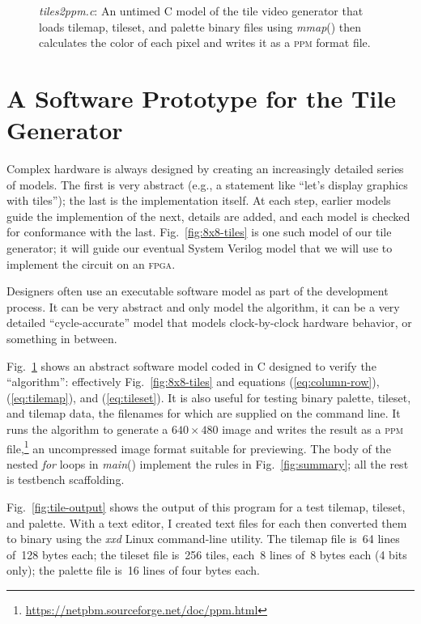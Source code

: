 \documentclass[11pt]{article}
\newcommand{\figref}[1]{Fig.~\ref{fig:#1}}
\newcommand{\equref}[1]{(\ref{eq:#1})}
\begin{document}
\begin{figure}
  
  \caption{\emph{tiles2ppm.c}:
    An untimed C model of the tile video generator that loads
    tilemap, tileset, and palette binary files using
    \emph{mmap}() then calculates the color of each pixel
    and writes it as a \textsc{ppm} format file.}
\label{fig:tile-sw}
\end{figure}

\section{A Software Prototype for the Tile Generator}

Complex hardware is always designed by creating an increasingly
detailed series of models.  The first is very abstract (e.g., a
statement like ``let's display graphics with tiles''); the last is the
implementation itself.  At each step, earlier models guide the
implemention of the next, details are added, and each model is checked
for conformance with the last.  \figref{8x8-tiles} is one such model
of our tile generator; it will guide our eventual System Verilog model
that we will use to implement the circuit on an \textsc{fpga}.

Designers often use an executable software model as part of the
development process.  It can be very abstract and only model the
algorithm, it can be a very detailed ``cycle-accurate'' model that
models clock-by-clock hardware behavior, or something in between.

\figref{tile-sw} shows an abstract software model coded in C designed
to verify the ``algorithm'': effectively \figref{8x8-tiles} and
equations \equref{column-row}, \equref{tilemap}, and \equref{tileset}.
It is also useful for testing binary palette, tileset, and tilemap
data, the filenames for which are supplied on the command line.  It
runs the algorithm to generate a $640\times480$ image and writes the
result as a \textsc{ppm}
file,\footnote{\url{https://netpbm.sourceforge.net/doc/ppm.html}} an
uncompressed image format suitable for previewing.  The body of the
nested \emph{for} loops in \emph{main}() implement the rules in
\figref{summary}; all the rest is testbench scaffolding.

\figref{tile-output} shows the output of this program for a test
tilemap, tileset, and palette.  With a text editor, I created text
files for each then converted them to binary using the \emph{xxd}
Linux command-line utility.  The tilemap file is~64 lines of~128 bytes
each; the tileset file is~256 tiles, each~8 lines of~8 bytes each (4
bits only); the palette file is~16 lines of four bytes each.
\end{document}
